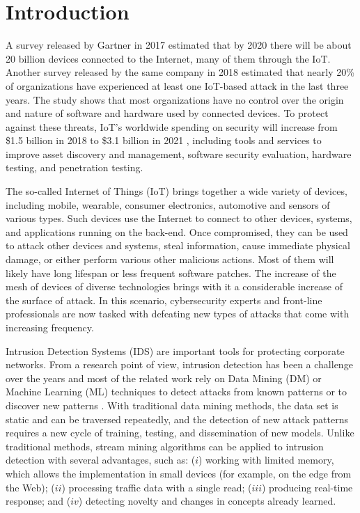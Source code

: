 \section{Introduction} 


\newcommand{\refminas}{\textit{Ref}\xspace}
\newcommand{\mfog}{\textit{MFOG}\xspace}
\newcommand{\iot}{IoT\xspace}
\newcommand{\nids}{NIDS\xspace}
\newcommand{\ds}{DS\xspace}


A survey released by Gartner in 2017 estimated that by 2020 there will be about
20 billion devices connected to the Internet, many of them through the
IoT\cite{gartner_forecast_2017}. Another survey released by the same company in
2018 estimated that nearly 20\% of organizations have experienced at least one
IoT-based attack in the last three years. The study shows that most
organizations have no control over the origin and nature of software and
hardware used by connected devices. To protect against these threats, IoT's
worldwide spending on security will increase from \$1.5 billion in 2018 to \$3.1
billion in 2021 \cite{gartner_it_glossary_2018}, including tools and services to
improve asset discovery and management, software security evaluation, hardware
testing, and penetration testing.

The so-called Internet of Things (IoT) brings together a wide variety of
devices, including mobile, wearable, consumer electronics, automotive and
sensors of various types. Such devices use the Internet to connect to other
devices, systems, and applications running on the back-end. Once compromised,
they can be used to attack other devices and systems, steal information, cause
immediate physical damage, or either perform various other malicious actions.
Most of them will likely have long lifespan or less frequent software patches.
The increase of the mesh of devices of diverse technologies brings with it a
considerable increase of the surface of attack. In this scenario, cybersecurity
experts and front-line professionals are now tasked with defeating new types of
attacks that come with increasing frequency.

Intrusion Detection Systems (IDS) are important tools for protecting corporate
networks. From a research point of view, intrusion detection has been a
challenge over the years and most of the related work rely on Data Mining (DM)
or Machine Learning (ML) techniques to detect attacks from known patterns or to
discover new patterns \cite{buczak2016survey,mitchell2014survey}. With
traditional data mining methods, the data set is static and can be traversed
repeatedly, and the detection of new attack patterns requires a new cycle of
training, testing, and dissemination of new models. Unlike traditional methods,
stream mining algorithms can be applied to intrusion detection with several
advantages, such as: ($ i $) working with limited memory, which allows the
implementation in small devices (for example, on the edge from the Web); ($ ii
$) processing traffic data with a single read; ($ iii $) producing real-time
response; and ($ iv $) detecting novelty and changes in concepts already
learned.

